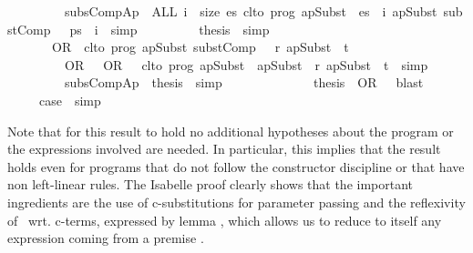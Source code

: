 \documentclass{llncs}
\newenvironment{isacode}
{\begin{list}{}{
\setlength{\leftmargin}{4pt}
\setlength{\rightmargin}{0pt}
\setlength{\listparindent}{0pt}\raggedright
\setlength{\itemsep}{0pt}
\setlength{\parsep}{0pt}
\normalfont\ttfamily }\item[]}
{\end{list}}
\begin{document}
{\begin{isacode}
\ \ \ \ \ \ \ \ \isamarkupfalse \ subsCompAp\ \isamarkupfalse \ {\isachardoublequoteopen}ALL\ i\ {\isacharless}\ size\ es{\isachardot}\ clto\ prog\ {\isacharparenleft}apSubst\ {\isasymtheta}\ {\isacharparenleft}es\ {\isacharbang}\ i{\isacharparenright}{\isacharparenright}\ {\isacharparenleft}apSubst\ {\isacharparenleft}substComp\ {\isasymtheta}\ {\isasymmu}{\isacharparenright}\ {\isacharparenleft}ps\ {\isacharbang}\ i{\isacharparenright}{\isacharparenright}{\isachardoublequoteclose}\ \isamarkupfalse \ simp\isanewline
\ \ \ \ \ \ \ \ \isamarkupfalse \ {\isacharquery}thesis\ \isamarkupfalse \ simp\isanewline
\ \ \ \ \ \ \isamarkupfalse \isanewline
\ \ \ \ \ \isamarkupfalse \isanewline
\ \ \ \ \ \ \isamarkupfalse \ OR\ \isamarkupfalse \ {\isachardoublequoteopen}clto\ prog\ {\isacharparenleft}apSubst\ {\isacharparenleft}substComp\ {\isasymtheta}\ {\isasymmu}{\isacharparenright}\ r{\isacharparenright}\ {\isacharparenleft}apSubst\ {\isasymtheta}\ t{\isacharparenright}{\isachardoublequoteclose}\isanewline
\ \ \ \ \ \ \isamarkupfalse \ {\isacharminus}\isanewline
\ \ \ \ \ \ \ \ \isamarkupfalse \ OR\ {\isacharparenleft}{}{\isacharparenright}\ \ OR\ {\isacharparenleft}{}{\isacharparenright}\ \isamarkupfalse \ {\isachardoublequoteopen}clto\ prog\ {\isacharparenleft}apSubst\ {\isasymtheta}\ {\isacharparenleft}apSubst\ {\isasymmu}\ r{\isacharparenright}{\isacharparenright}\ {\isacharparenleft}apSubst\ {\isasymtheta}\ t{\isacharparenright}{\isachardoublequoteclose}\ \isamarkupfalse \ simp\isanewline
\ \ \ \ \ \ \ \ \isamarkupfalse \ subsCompAp\ \isamarkupfalse \ {\isacharquery}thesis\ \isamarkupfalse \ simp\isanewline
\ \ \ \ \ \ \isamarkupfalse \isanewline
\ \ \ \ \ \isamarkupfalse \ \isamarkupfalse \ {\isacharquery}thesis\ \isamarkupfalse \ OR\ {\isacharparenleft}{}{\isacharparenright}\ \isamarkupfalse \ blast\isanewline
\ \ \ \ \isamarkupfalse \isanewline
\ \ \ \ \isamarkupfalse \ {\isacharquery}case\ \isamarkupfalse \ simp\isanewline
{}\isamarkupfalse \endisatagproof
{\isafoldproof}\end{isacode}}{}

Note that for this result to hold no additional hypotheses about the
program or the expressions involved are needed. In particular, this
implies that the result holds even for programs that do not follow the
constructor discipline or that have non left-linear rules. The
Isabelle proof clearly shows that the important ingredients are the
use of c-substitutions for parameter passing and the reflexivity of
\crwl\ wrt. c-terms, expressed by lemma , which
allows us to reduce to itself any expression 
coming from a premise .
\end{document}
